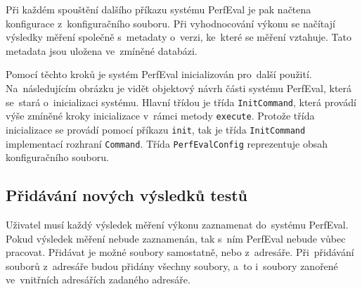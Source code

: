 Při každém spouštění dalšího příkazu systému PerfEval je pak načtena konfigurace z~konfiguračního souboru.
Při vyhodnocování výkonu se načítají výsledky měření společně s~metadaty o~verzi, ke~které se měření vztahuje.
Tato metadata jsou uložena ve~zmíněné databázi.

Pomocí těchto kroků je systém PerfEval inicializován pro~další použití.
Na~následujícím obrázku je vidět objektový návrh části systému PerfEval, která se~stará o~inicializaci systému.
Hlavní třídou je třída \lstinline|InitCommand|, která provádí výše zmíněné kroky inicializace v~rámci metody \lstinline|execute|.
Protože třída inicializace se provádí pomocí příkazu \texttt{init}, tak je třída \lstinline|InitCommand| implementací rozhraní \lstinline|Command|.
Třída \lstinline|PerfEvalConfig| reprezentuje obsah konfiguračního souboru.


\subsection{Přidávání nových výsledků testů}

Uživatel musí každý výsledek měření výkonu zaznamenat do~systému PerfEval. Pokud výsledek měření nebude zaznamenán, tak s~ním
PerfEval nebude vůbec pracovat. Přidávat je možné soubory samostatně, nebo z~adresáře. Při~přidávání souborů z~adresáře budou
přidány všechny soubory, a~to i~soubory zanořené ve~vnitřních adresářích zadaného adresáře.

